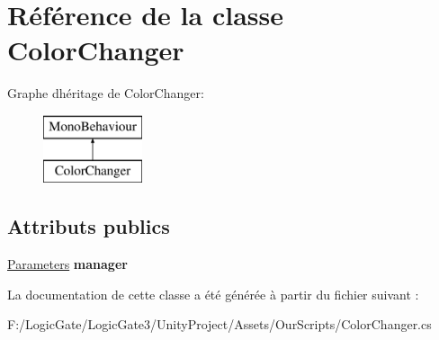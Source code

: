 \hypertarget{class_color_changer}{}\section{Référence de la classe Color\+Changer}
\label{class_color_changer}
Graphe d\textquotesingle{}héritage de Color\+Changer\+:\begin{figure}[H]
\begin{center}
\leavevmode
\includegraphics[height=2.000000cm]{class_color_changer}
\end{center}
\end{figure}
\subsection*{Attributs publics}
\begin{DoxyCompactItemize}
\item 
\mbox{\label{class_color_changer_a0a73a532b8ee1f26dbc3b8944f33b6e4}} 
\mbox{\hyperlink{class_parameters}{Parameters}} {\bfseries manager}
\end{DoxyCompactItemize}


La documentation de cette classe a été générée à partir du fichier suivant \+:\begin{DoxyCompactItemize}
\item 
F\+:/\+Logic\+Gate/\+Logic\+Gate3/\+Unity\+Project/\+Assets/\+Our\+Scripts/Color\+Changer.\+cs\end{DoxyCompactItemize}
